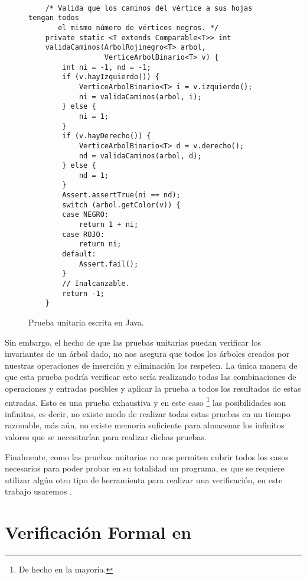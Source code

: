 \begin{figure}[!ht]
\centering
\captionsetup{justification=centering}
\begin{verbatim}

    /* Valida que los caminos del vértice a sus hojas tengan todos
       el mismo número de vértices negros. */
    private static <T extends Comparable<T>> int
    validaCaminos(ArbolRojinegro<T> arbol,
                  VerticeArbolBinario<T> v) {
        int ni = -1, nd = -1;
        if (v.hayIzquierdo()) {
            VerticeArbolBinario<T> i = v.izquierdo();
            ni = validaCaminos(arbol, i);
        } else {
            ni = 1;
        }
        if (v.hayDerecho()) {
            VerticeArbolBinario<T> d = v.derecho();
            nd = validaCaminos(arbol, d);
        } else {
            nd = 1;
        }
        Assert.assertTrue(ni == nd);
        switch (arbol.getColor(v)) {
        case NEGRO:
            return 1 + ni;
        case ROJO:
            return ni;
        default:
            Assert.fail();
        }
        // Inalcanzable.
        return -1;
    }

\end{verbatim}
\caption{Prueba unitaria escrita en Java.\cite{CanekPU}}
\label{unitTestjava}
\end{figure}

Sin embargo, el hecho de que las pruebas unitarias puedan verificar los invariantes de un \'arbol
dado, no nos asegura que todos los \'arboles creados por nuestras operaciones de inserci\'on y
eliminaci\'on los respeten. La \'unica manera de que esta prueba podr\'ia verificar esto ser\'ia
realizando todas las combinaciones de operaciones y entradas posibles y aplicar la prueba a todos los
resultados de estas entradas. Esto es una prueba exhaustiva y en este caso \footnote{De hecho en la
mayoría.} las posibilidades son infinitas, es decir, no existe modo de realizar todas estas pruebas
en un tiempo razonable, m\'as a\'un, no existe memoria suficiente para almacenar los infinitos valores que se necesitar\'ian para realizar dichas pruebas. 

Finalmente, como las pruebas unitarias no nos permiten cubrir todos los casos necesarios para poder probar en su totalidad un programa, es que se requiere utilizar algún otro tipo de herramienta para realizar una verificaci\'on, en este trabajo usaremos {\coq}.


\section{Verificaci\'on Formal en {\coq}}

